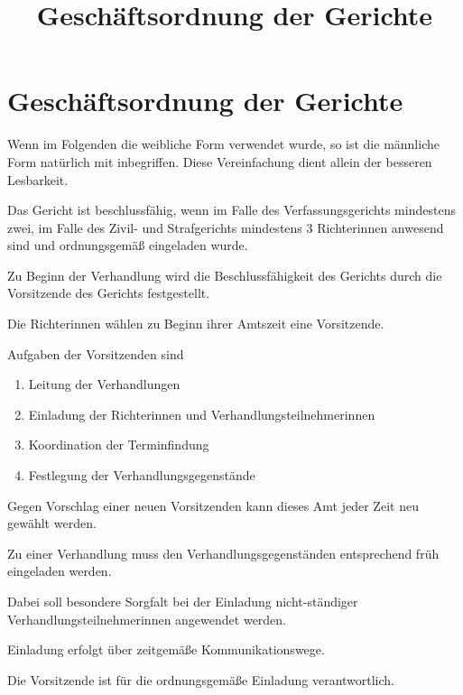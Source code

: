 \documentclass{sasbase}
\begin{document}
\title{Gesch\"{a}ftsordnung der Gerichte}

\setcounter{secnumdepth}{5}

\mytitle

\parensstyle

\section{Gesch\"{a}ftsordnung der Gerichte}
Wenn im Folgenden die weibliche Form verwendet wurde, so ist die m\"{a}nnliche Form nat\"{u}rlich mit inbegriffen. Diese Vereinfachung dient allein der besseren Lesbarkeit.


\begin{article}[Beschlussfähigkeit]
	\item Das Gericht ist beschlussfähig, wenn im Falle des Verfassungsgerichts mindestens zwei,
        im Falle des Zivil- und Strafgerichts mindestens 3 Richterinnen anwesend sind und
        ordnungsgemäß eingeladen wurde.
	\item Zu Beginn der Verhandlung wird die Beschlussfähigkeit des Gerichts durch die Vorsitzende
        des Gerichts festgestellt.
\end{article}

\begin{article}[Vorsitz]
    \item Die Richterinnen wählen zu Beginn ihrer Amtszeit eine Vorsitzende.
    \item Aufgaben der Vorsitzenden sind
        \begin{enumerate}
            \item Leitung der Verhandlungen
            \item Einladung der Richterinnen und Verhandlungsteilnehmerinnen
            \item Koordination der Terminfindung
            \item Festlegung der Verhandlungsgegenstände
        \end{enumerate}
    \item Gegen Vorschlag einer neuen Vorsitzenden kann dieses Amt jeder Zeit neu gewählt werden.
\end{article}

\begin{article}[Einladung]
    \item Zu einer Verhandlung muss den Verhandlungsgegenständen entsprechend früh eingeladen
        werden.
    \item Dabei soll besondere Sorgfalt bei der Einladung nicht-ständiger Verhandlungsteilnehmerinnen angewendet werden.
    \item Einladung erfolgt über zeitgemäße Kommunikationswege.
    \item Die Vorsitzende ist für die ordnungsgemäße Einladung verantwortlich.
\end{article}
\end{document}
